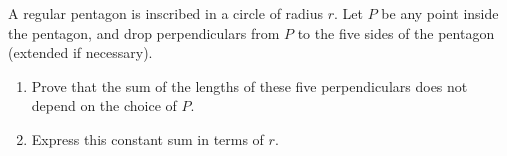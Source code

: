 A regular pentagon is inscribed in a circle of radius $r$. Let $P$ be any point inside the pentagon, and drop perpendiculars from $P$ to the five sides of the pentagon (extended if necessary).
\begin{enumerate}
\item[(a)] Prove that the sum of the lengths of these five perpendiculars does not depend on the choice of $P$.
\item[(b)] Express this constant sum in terms of $r$.
\end{enumerate}
